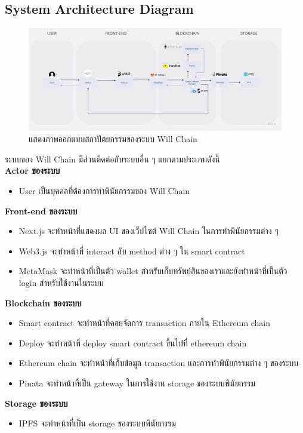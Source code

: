 \documentclass[12pt,oneside,openright,a4paper]{cpe-thai-project}
\begin{document}
\subsection{System Architecture Diagram}
	\begin{figure}[!thb]
		\centering
		\includegraphics[scale=0.2]{systemArch}
		\caption{แสดงภาพออกแบบสถาปัตยกรรมของระบบ Will Chain}
	\end{figure}
	\FloatBarrier
ระบบของ Will Chain มีส่วนติดต่อกับระบบอื่น ๆ แยกตามประเภทดังนี้ \\
\textbf{Actor ของระบบ}
	\begin{itemize}
		\item User เป็นบุคคลที่ต้องการทำพินัยกรรมของ Will Chain
	\end{itemize}
\textbf{Front-end ของระบบ}
	\begin{itemize}
		\item Next.js จะทำหน้าที่แสดงผล UI ของเว็ปไซต์ Will Chain ในการทำพินัยกรรมต่าง ๆ 
		\item Web3.js จะทำหน้าที่ interact กับ method ต่าง ๆ ใน smart contract
		\item MetaMask จะทำหน้าที่เป็นตัว wallet สำหรับเก็บทรัพย์สินของเราและยังทำหน้าที่เป็นตัว login สำหรับใช้งานในระบบ
	\end{itemize}
\textbf{Blockchain ของระบบ}
	\begin{itemize}
		\item Smart contract จะทำหน้าที่คอยจัดการ transaction ภายใน Ethereum chain
		\item Deploy จะทำหน้าที่ deploy smart contract ขึ้นไปที่ ethereum chain
		\item Ethereum chain จะทำหน้าที่เก็บข้อมูล transaction และการทำพินัยกรรมต่าง ๆ ของระบบ
		\item Pinata จะทำหน้าที่เป็น gateway ในการใช้งาน storage ของระบบพินัยกรรม
	\end{itemize}
\textbf{Storage ของระบบ}
	\begin{itemize}
		\item IPFS จะทำหน้าที่เป็น storage ของระบบพินัยกรรม
	\end{itemize}
\clearpage
\end{document}
